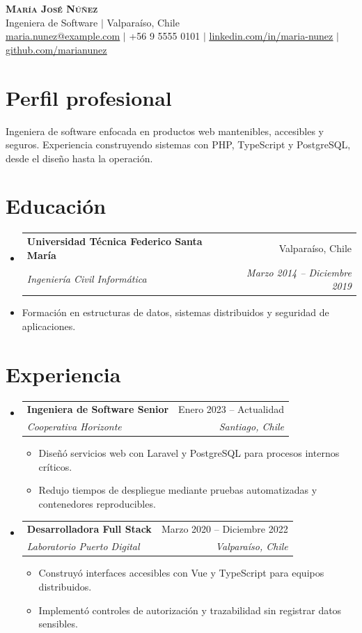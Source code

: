 \documentclass[a4paper,11pt]{article}
\makeatletter
\newcommand{\resumeItem}[1]{
  \item\small{{#1 \vspace{-2pt}}}
}
\newcommand{\resumeSubheading}[4]{
  \vspace{-2pt}\item
    \begin{tabular*}{0.97\textwidth}[t]{l@{\extracolsep{\fill}}r}
      \textbf{#1} & #2 \\
      \textit{\small #3} & \textit{\small #4} \\
    \end{tabular*}\vspace{-7pt}
}
\newcommand{\resumeDescription}[1]{
  \item[]\small{{#1 \vspace{-4pt}}}
}
\newcommand{\resumeSubHeadingListStart}{\begin{itemize}[leftmargin=0.15in,label={}]}
\newcommand{\resumeSubHeadingListEnd}{\end{itemize}}
\newcommand{\resumeItemListStart}{\begin{itemize}}
\newcommand{\resumeItemListEnd}{\end{itemize}\vspace{-5pt}}
\makeatother
\begin{document}
\begin{center}
  \textbf{\Huge \scshape María José Núñez} \\ \vspace{1pt}
  \small Ingeniera de Software $|$ Valparaíso, Chile \\ \vspace{1pt}
  \href{mailto:maria.nunez@example.com}{\underline{maria.nunez@example.com}} $|$
  +56 9 5555 0101 $|$
  \href{https://www.linkedin.com/in/maria-nunez}{\underline{linkedin.com/in/maria-nunez}} $|$
  \href{https://github.com/marianunez}{\underline{github.com/marianunez}}
\end{center}

\section{Perfil profesional}
\small{Ingeniera de software enfocada en productos web mantenibles, accesibles y seguros. Experiencia construyendo sistemas con PHP, TypeScript y PostgreSQL, desde el diseño hasta la operación.}

\section{Educación}
\resumeSubHeadingListStart
  \resumeSubheading
    {Universidad Técnica Federico Santa María}{Valparaíso, Chile}
    {Ingeniería Civil Informática}{Marzo 2014 -- Diciembre 2019}
  \resumeDescription{Formación en estructuras de datos, sistemas distribuidos y seguridad de aplicaciones.}
\resumeSubHeadingListEnd

\section{Experiencia}
\resumeSubHeadingListStart
  \resumeSubheading
    {Ingeniera de Software Senior}{Enero 2023 -- Actualidad}
    {Cooperativa Horizonte}{Santiago, Chile}
  \resumeItemListStart
    \resumeItem{Diseñó servicios web con Laravel y PostgreSQL para procesos internos críticos.}
    \resumeItem{Redujo tiempos de despliegue mediante pruebas automatizadas y contenedores reproducibles.}
  \resumeItemListEnd
  \resumeSubheading
    {Desarrolladora Full Stack}{Marzo 2020 -- Diciembre 2022}
    {Laboratorio Puerto Digital}{Valparaíso, Chile}
  \resumeItemListStart
    \resumeItem{Construyó interfaces accesibles con Vue y TypeScript para equipos distribuidos.}
    \resumeItem{Implementó controles de autorización y trazabilidad sin registrar datos sensibles.}
  \resumeItemListEnd
\resumeSubHeadingListEnd
\end{document}
